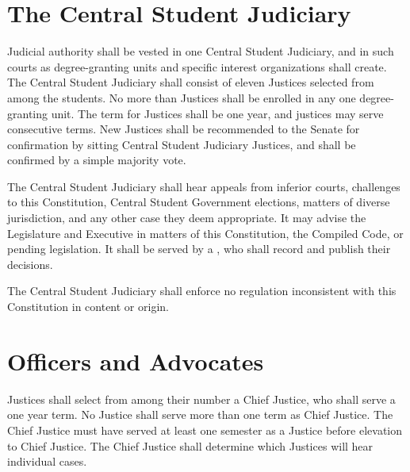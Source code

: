 
\section{The Central Student Judiciary}
    Judicial authority shall be vested in one Central Student Judiciary, and in such courts as degree-granting units and specific interest organizations shall create. The Central Student Judiciary shall consist of eleven Justices selected from among the students. No more than  Justices shall be enrolled in any one degree-granting unit. The term for Justices shall be one year, and justices may serve consecutive terms. New Justices shall be recommended to the Senate for confirmation by sitting Central Student Judiciary Justices, and shall be confirmed by a simple majority vote.

    The Central Student Judiciary shall hear appeals from inferior courts, challenges to this Constitution, Central Student Government elections, matters of diverse jurisdiction, and any other case they deem appropriate. It may advise the Legislature and Executive in matters of this Constitution, the Compiled Code, or pending legislation. It shall be served by a , who shall record and publish their decisions.



    The Central Student Judiciary shall enforce no regulation inconsistent with this Constitution in content or origin.

\section{Officers and Advocates}
    Justices shall select from among their number a Chief Justice, who shall serve a one year term. No Justice shall serve more than one term as Chief Justice. The Chief Justice must have served at least one semester as a Justice before elevation to Chief Justice. The Chief Justice shall determine which Justices will hear individual cases.

